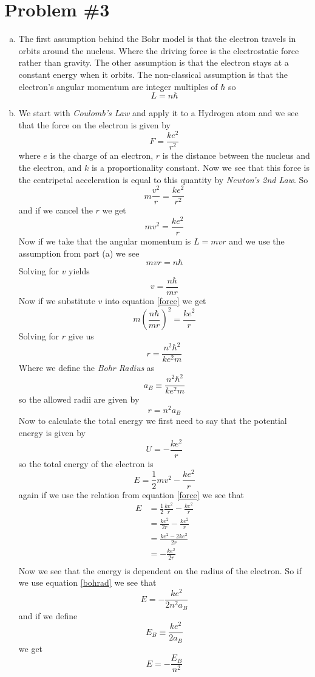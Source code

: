 \documentclass[11pt]{article}
\numberwithin{equation}{section}
\begin{document}
\section{Problem \#3}
\begin{enumerate}[(a)]
\item
The first assumption behind the Bohr model is that the electron travels in orbits around the nucleus. Where the driving force is the electrostatic force rather than gravity. The other assumption is that the electron stays at a constant energy when it orbits. The non-classical assumption is that the electron's angular momentum are integer multiples of $\hbar$ so
$$L = n\hbar$$

\item
We start with \emph{Coulomb's Law} and apply it to a Hydrogen atom and we see that the force on the electron is given by
$$F = \frac{ke^2}{r^2}$$
where $e$ is the charge of an electron, $r$ is the distance between the nucleus and the electron, and $k$ is a proportionality constant. Now we see that this force is the centripetal acceleration is equal to this quantity by \emph{Newton's 2nd Law}. So
$$m\frac{v^2}{r} = \frac{ke^2}{r^2}$$
and if we cancel the $r$ we get
\begin{equation}
mv^2 = \frac{ke^2}{r}
\label{force}
\end{equation}
Now if we take that the angular momentum is $L = mvr$ and we use the assumption from part (a) we see
$$mvr = n\hbar$$
Solving for $v$ yields
$$v = \frac{n\hbar}{mr}$$
Now if we substitute $v$ into equation \ref{force} we get
$$m\left(\frac{n\hbar}{mr}\right)^2 = \frac{ke^2}{r}$$
Solving for $r$ give us
$$r = \frac{n^2\hbar^2}{ke^2m}$$
Where we define the \emph{Bohr Radius} as
$$a_B\equiv\frac{n^2\hbar^2}{ke^2m}$$
so the allowed radii are given by
\begin{equation}
r = n^2a_B
\label{bohrad}
\end{equation}
Now to calculate the total energy we first need to say that the potential energy is given by
$$U = -\frac{ke^2}{r}$$
so the total energy of the electron is 
$$E = \frac{1}{2}mv^2 - \frac{ke^2}{r}$$
again if we use the relation from equation \ref{force} we see that
\begin{align*}
E &= \frac{1}{2}\frac{ke^2}{r} - \frac{ke^2}{r}\\
&= \frac{ke^2}{2r} - \frac{ke^2}{r}\\
&= \frac{ke^2 - 2ke^2}{2r}\\
&= -\frac{ke^2}{2r}\\
\end{align*}
Now we see that the energy is dependent on the radius of the electron. So if we use equation \ref{bohrad} we see that
$$E = -\frac{ke^2}{2n^2a_B}$$
and if we define 
$$E_B \equiv \frac{ke^2}{2a_B}$$ 
we get 
$$E = -\frac{E_B}{n^2}$$


\end{enumerate}
\end{document}

